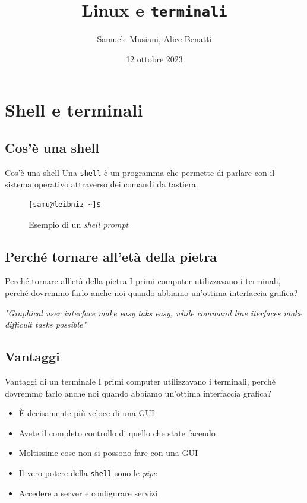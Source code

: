 \documentclass{beamer}
\title{Linux e \texttt{terminali}}
\author{Samuele Musiani, Alice Benatti}
\institute{Università di Bologna, corso di Laurea in Informatica}
\date{12 ottobre 2023}
\begin{document}
\begin{frame} 
  \titlepage
\end{frame}

\section{Shell e terminali}

\subsection{Cos'è una shell}
\begin{frame}[fragile]{Cos'è una shell}
  Una \texttt{shell} è un programma che permette di parlare con il sistema 
  operativo attraverso dei comandi da tastiera.
  \pause

  \begin{figure}
        \begin{lstlisting}
[samu@leibniz ~]$
    \end{lstlisting}
    \caption{Esempio di un \textit{shell prompt}}
  \end{figure}
\end{frame}

\subsection{Perché tornare all'età della pietra}
\begin{frame}{Perché tornare all'età della pietra}
  I primi computer utilizzavano i terminali, perché dovremmo farlo anche noi
  quando abbiamo un'ottima interfaccia grafica?\bigskip
  \pause

  \textit{"Graphical user interface make easy taks easy, while command line 
  iterfaces make difficult tasks possible"}
\end{frame}

\subsection{Vantaggi}
\begin{frame}{Vantaggi di un terminale}
  I primi computer utilizzavano i terminali, perché dovremmo farlo anche noi
  quando abbiamo un'ottima interfaccia grafica?\bigskip

  \begin{itemize}
    \item <1-> È decisamente più veloce di una GUI
    \item <2-> Avete il completo controllo di quello che state facendo
    \item <3-> Moltissime cose non si possono fare con una GUI
    \item <4-> Il vero potere della \texttt{shell} sono le \textit{pipe}
    \item <5-> Accedere a server e configurare servizi
  \end{itemize}
\end{frame}
\end{document}
